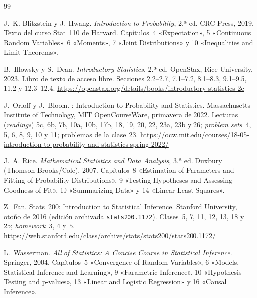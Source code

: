 \begin{thebibliography}{99}
\small

J.~K. Blitzstein y J.~Hwang.
\newblock \emph{Introduction to Probability}, 2.ª ed.
\newblock CRC Press, 2019.
\newblock Texto del curso Stat~110 de Harvard. Capítulos~4 «Expectation», 5 «Continuous Random Variables», 6 «Moments», 7 «Joint Distributions» y 10 «Inequalities and Limit Theorems».

B.~Illowsky y S.~Dean.
\newblock \emph{Introductory Statistics}, 2.ª ed.
\newblock OpenStax, Rice University, 2023. Libro de texto de acceso libre. Secciones 2.2--2.7, 7.1--7.2, 8.1--8.3, 9.1--9.5, 11.2 y 12.3--12.4.
\newblock \url{https://openstax.org/details/books/introductory-statistics-2e}

J.~Orloff y J.~Bloom.
: Introduction to Probability and Statistics.
\newblock Massachusetts Institute of Technology, MIT OpenCourseWare, primavera de 2022. Lecturas (\emph{readings}) 5c, 6b, 7b, 10a, 10b, 17b, 18, 19, 20, 22, 23a, 23b y 26; \emph{problem sets}~4, 5, 6, 8, 9, 10 y 11; problemas de la clase~23.
\newblock \url{https://ocw.mit.edu/courses/18-05-introduction-to-probability-and-statistics-spring-2022/}

J.~A. Rice.
\newblock \emph{Mathematical Statistics and Data Analysis}, 3.ª ed.
\newblock Duxbury (Thomson Brooks/Cole), 2007. Capítulos~8 «Estimation of Parameters and Fitting of Probability Distributions», 9 «Testing Hypotheses and Assessing Goodness of Fit», 10 «Summarizing Data» y 14 «Linear Least Squares».

Z.~Fan.
\newblock Stats~200: Introduction to Statistical Inference.
\newblock Stanford University, otoño de 2016 (edición archivada \texttt{stats200.1172}). Clases~5, 7, 11, 12, 13, 18 y 25; \emph{homework}~3, 4 y~5.
\newblock \url{https://web.stanford.edu/class/archive/stats/stats200/stats200.1172/}

L.~Wasserman.
\newblock \emph{All of Statistics: A Concise Course in Statistical Inference}.
\newblock Springer, 2004. Capítulos~5 «Convergence of Random Variables», 6 «Models, Statistical Inference and Learning», 9 «Parametric Inference», 10 «Hypothesis Testing and p-values», 13 «Linear and Logistic Regression» y 16 «Causal Inference».

\end{thebibliography}
